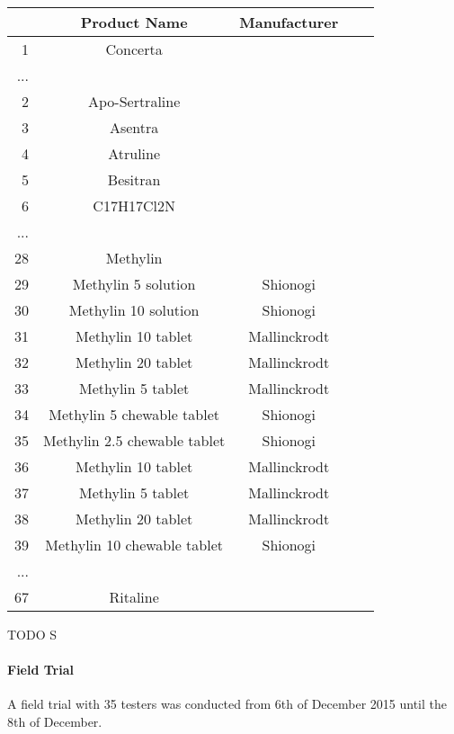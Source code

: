 \documentclass[11pt,titlepage,oneside,openany]{book}
\begin{document}
\begin{center}
\begin{tabular}{rccll}
\hline 
 & \textbf{Product Name} &\textbf{ Manufacturer}  \\ 
\hline 
1 & Concerta &  \\ 
\hline 
...  &  &  \\ 
\hline 
2 & Apo-Sertraline & \\ 
\hline 
3 & Asentra &  \\ 
\hline 
4 & Atruline	 &  \\ 
\hline 
5 & Besitran	 &  \\ 
\hline 
6 & C17H17Cl2N &  \\ 
\hline 
...  &  &  \\ 
\hline 
28	&Methylin	&\\ 
\hline  
29	&Methylin 5 solution	&Shionogi \\ 
\hline  
30	&Methylin 10 solution	&Shionogi \\ 
\hline 
31	&Methylin 10 tablet	&Mallinckrodt \\ 
\hline 
32	&Methylin 20 tablet	&Mallinckrodt \\ 
\hline 
33	&Methylin 5 tablet	&Mallinckrodt \\ 
\hline 
34	&Methylin 5 chewable tablet	&Shionogi \\ 
\hline 
35	&Methylin 2.5 chewable tablet	&Shionogi \\ 
\hline 
36	&Methylin 10 tablet	&Mallinckrodt \\ 
\hline 
37	&Methylin 5 tablet	&Mallinckrodt \\ 
\hline 
38	&Methylin 20 tablet	&Mallinckrodt \\ 
\hline 
39	&Methylin 10 chewable tablet	&Shionogi\\ 
\hline 
...  &  &  \\ 
\hline  

67 & Ritaline &  \\ 
\hline 
\end{tabular}
\label{example:ritalin}
\end{center}




TODO S

\paragraph{Field Trial}
\label{cha:field_trial}
A field trial with 35 testers was conducted from 6th of December 2015 until the 8th of December.
\end{document}

